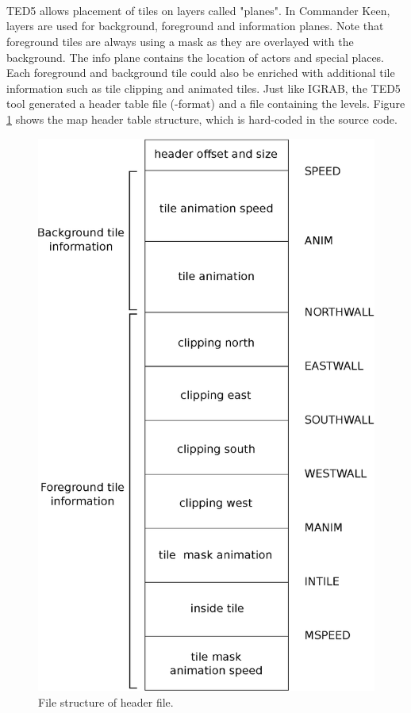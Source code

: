 \documentclass[book.tex]{subfiles}
\begin{document}
 
 \par
 \\
 \par
{}\\
 


 \\
\par



 \par
 TED5 allows placement of tiles on layers called "planes". In Commander Keen, layers are used for background, foreground and information planes. Note that foreground tiles are always using a mask as they are overlayed with the background. The info plane contains the location of actors and special places. Each foreground and background tile could also be enriched with additional tile information such as tile clipping and animated tiles. Just like IGRAB, the TED5 tool generated a header table file (-format) and a  file containing the levels. Figure \ref{fig:map-header-file} shows the map header table structure, which is hard-coded in the source code.\\
 
\begin{figure}[H]
\centering
 \includegraphics[width=.65\textwidth]{imgs/drawings/map_header.eps}
 \caption{File structure of  header file.}
 \label{fig:map-header-file}
\end{figure}
\par
\end{document}
